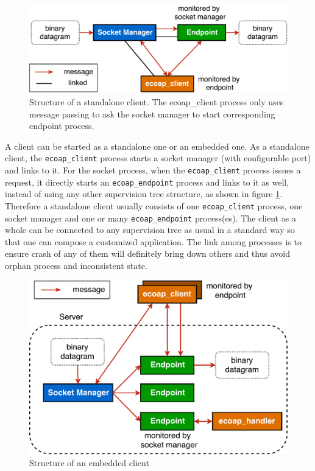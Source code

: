 \begin{figure}[!htbp]
\centering
\includegraphics[scale = 0.55]{ecoap_client_standalone}
\caption[Structure of a standalone client]{Structure of a standalone client. The ecoap\_client process only uses message passing to ask the socket manager to start corresponding endpoint process.}
\label{fig:ecoap_client_standalone}
\end{figure}

A client can be started as a standalone one or an embedded one. As a standalone client, the \verb|ecoap_client| process starts a socket manager (with configurable port) and links to it. For the socket process, when the \verb|ecoap_client| process issues a request, it directly starts an \verb|ecoap_endpoint| process and links to it as well, instead of using any other supervision tree structure, as shown in figure \ref{fig:ecoap_client_standalone}. Therefore a standalone client usually consists of one \verb|ecoap_client| process, one socket manager and one or many \verb|ecoap_endpoint| process(es). The client as a whole can be connected to any supervision tree as usual in a standard way so that one can compose a customized application. The link among processes is to ensure crash of any of them will definitely bring down others and thus avoid orphan process and inconsistent state. 

\begin{figure}[!htbp]
\centering
\includegraphics[scale = 0.55]{ecoap_client_embedded}
\caption{Structure of an embedded client}
\label{fig:ecoap_client_embedded}
\end{figure}


